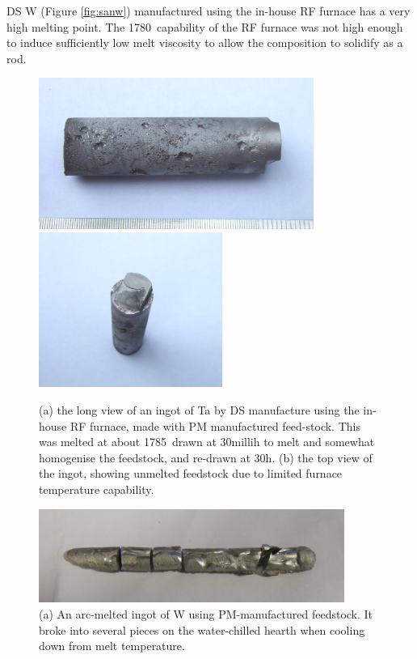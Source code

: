 DS W (Figure \ref{fig:sanw})  manufactured using the in-house RF furnace has a very high melting point.  The 1780\celsius\ capability of the RF furnace was not high enough to induce sufficiently low melt viscosity to allow the composition to solidify as a rod.
%
\begin{figure}[H]
\begin{center}
\includegraphics[width=9cm]{santarf}
\includegraphics[width=6cm]{santarftop}
\caption{(a) the long view of an ingot of Ta by DS manufacture using the in-house RF furnace, made with PM manufactured feed-stock. This was melted at about 1785\celsius\, drawn at 30milli\metre\/h to melt and somewhat homogenise the feedstock, and re-drawn at 30\milli\metre\/h.  (b) the top view of the ingot, showing unmelted feedstock due to limited furnace temperature capability.}
\label{fig:santarf}
\end{center}
\end{figure}
%
%
\begin{figure}[H]
\begin{center}
\includegraphics[width=10cm]{sanw_arc}
\caption{(a) An arc-melted ingot of W using PM-manufactured feedstock.  It broke into several pieces on the water-chilled hearth when cooling down from melt temperature.}
\label{fig:sanw_arc}
\end{center}
\end{figure}
%

